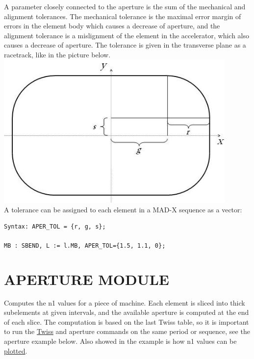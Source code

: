 A parameter closely connected to the aperture is the sum of the mechanical and alignment tolerances. The mechanical tolerance is the maximal error margin of errors in the element body which causes a decrease of aperture, and the alignment tolerance is a mislignment of the element in the accelerator, which also causes a decrease of aperture. The tolerance is given in the transverse plane as a racetrack, like in the picture below.
\\
\includegraphics[width=450px]{Introduction/tolerance.jpg}
\\ A tolerance can be assigned to each element in a MAD-X sequence as a vector: 
\begin{verbatim}
Syntax: APER_TOL = {r, g, s};

MB : SBEND, L := l.MB, APER_TOL={1.5, 1.1, 0};
\end{verbatim}

\section{APERTURE MODULE}

Computes the n1 values for a piece of machine. Each element is sliced into thick subelements at given intervals, and the available aperture is computed at the end of each slice. The computation is based on the last Twiss table, so it is important to run the \href{../twiss/twiss.html}{Twiss} and aperture commands on the same period or sequence, see the aperture example below. Also showed in the example is how n1 values can be \href{../plot/plot.html}{plotted}.  

